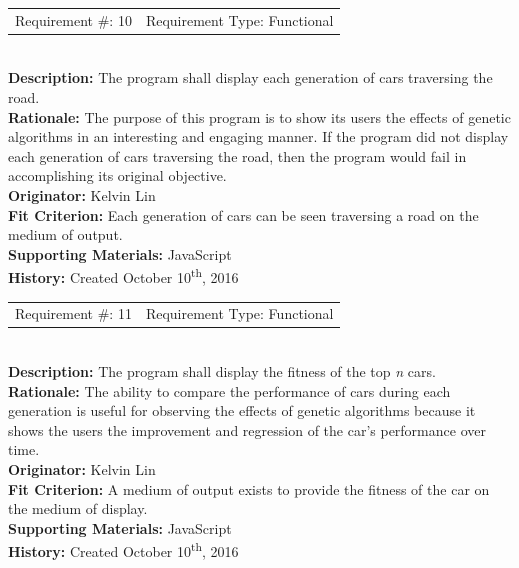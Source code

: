 \documentclass[12pt, titlepage]{article}
\begin{document}
\begin{reqbox}
%
\begin{tabular}{cc}
Requirement \#: 10 & Requirement Type: Functional \\
\end{tabular} \\
%
\textbf{Description:} The program shall display each generation of cars 
traversing the road. \\
\textbf{Rationale:} The purpose of this program is to show its users the effects 
of genetic algorithms in an interesting and engaging manner. If the program did 
not display each generation of cars traversing the road, then the program would 
fail in accomplishing its original objective. \\
\textbf{Originator:} Kelvin Lin\\
\textbf{Fit Criterion:} Each generation of cars can be seen traversing a road on 
the medium of output.\\
%  
\textbf{Supporting Materials:} JavaScript \\
\textbf{History:} Created October 10\textsuperscript{th}, 2016
%
\end{reqbox}

\begin{reqbox}
%
\begin{tabular}{cc}
Requirement \#: 11 & Requirement Type: Functional \\
\end{tabular} \\
%
\textbf{Description:} The program shall display the fitness of the top 
\textit{n} cars. \\
\textbf{Rationale:} The ability to compare the performance of cars during each 
generation is useful for observing the effects of genetic algorithms because it 
shows the users the improvement and regression of the car's performance over 
time.\\
\textbf{Originator:} Kelvin Lin\\
\textbf{Fit Criterion:} A medium of output exists to provide the fitness of the 
car on the medium of display.\\
%  
\textbf{Supporting Materials:} JavaScript \\
\textbf{History:} Created October 10\textsuperscript{th}, 2016
%
\end{reqbox}

\newpage
\end{document}
